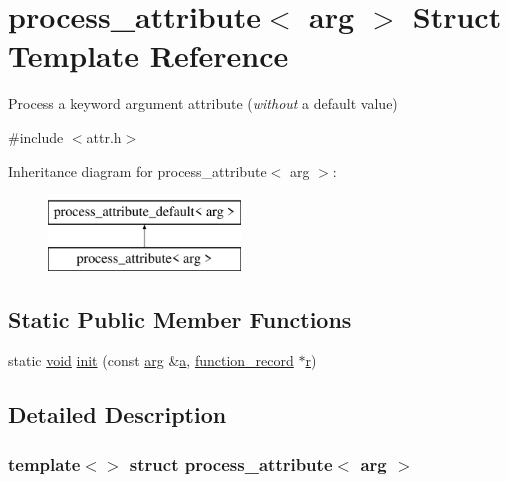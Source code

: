 \hypertarget{structprocess__attribute_3_01arg_01_4}{}\section{process\+\_\+attribute$<$ arg $>$ Struct Template Reference}
\label{structprocess__attribute_3_01arg_01_4}


Process a keyword argument attribute ({\itshape without} a default value)  




{\ttfamily \#include $<$attr.\+h$>$}

Inheritance diagram for process\+\_\+attribute$<$ arg $>$\+:\begin{figure}[H]
\begin{center}
\leavevmode
\includegraphics[height=2.000000cm]{structprocess__attribute_3_01arg_01_4}
\end{center}
\end{figure}
\subsection*{Static Public Member Functions}
\begin{DoxyCompactItemize}
\item 
static \mbox{\hyperlink{_s_d_l__opengles2__gl2ext_8h_ae5d8fa23ad07c48bb609509eae494c95}{void}} \mbox{\hyperlink{structprocess__attribute_3_01arg_01_4_a256bf466859197e079b902fb77c5d01c}{init}} (const \mbox{\hyperlink{structarg}{arg}} \&\mbox{\hyperlink{_s_d_l__opengl__glext_8h_a3309789fc188587d666cda5ece79cf82}{a}}, \mbox{\hyperlink{structfunction__record}{function\+\_\+record}} $\ast$\mbox{\hyperlink{_s_d_l__opengl_8h_a42ce7cdc612e53abee15043f80220d97}{r}})
\end{DoxyCompactItemize}


\subsection{Detailed Description}
\subsubsection*{template$<$$>$\newline
struct process\+\_\+attribute$<$ arg $>$}


